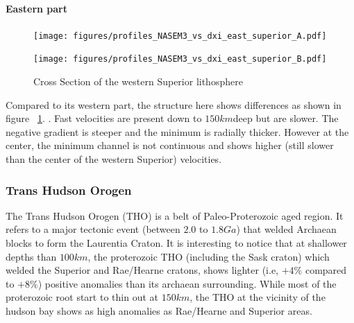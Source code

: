 \documentclass[12pt]{article}
\begin{document}
		\paragraph{Eastern part}
		\begin{figure}
			\begin{minipage}{0.5\linewidth}
				\centerline{\texttt{[image: figures/profiles\_NASEM3\_vs\_dxi\_east\_superior\_A.pdf]}}
			\end{minipage}
			\hfill
			\begin{minipage}{0.5\linewidth}
				\centerline{\texttt{[image: figures/profiles\_NASEM3\_vs\_dxi\_east\_superior\_B.pdf]}}
			\end{minipage}

			\caption{Cross Section of the western Superior lithosphere}
			\label{eastsupcross}

		\end{figure}

		Compared to its western part, the structure here shows differences as shown in figure ~\ref{eastsupcross}. . 
		Fast velocities are present down to $150km$deep but are slower. 
		The negative gradient is steeper and the minimum is radially thicker. 
		However at the center, the minimum channel is not continuous and shows higher (still slower than the center of the western Superior) velocities.

\subsubsection{Trans Hudson Orogen}
	The Trans Hudson Orogen (THO) is a belt of Paleo-Proterozoic aged region. It refers to a major tectonic event (between $2.0$ to $1.8Ga$) that welded Archaean blocks to form the Laurentia Craton.
	It is interesting to notice that at shallower depths than $100km$, the proterozoic THO (including the Sask craton) which welded the Superior and Rae/Hearne cratons, shows lighter (i.e, $+4\%$ compared to $+8\%$) positive anomalies than its archaean surrounding. While most of the proterozoic root start to thin out at $150km$, the THO at the vicinity of the hudson bay shows as high anomalies as Rae/Hearne and Superior areas. 
\end{document}
